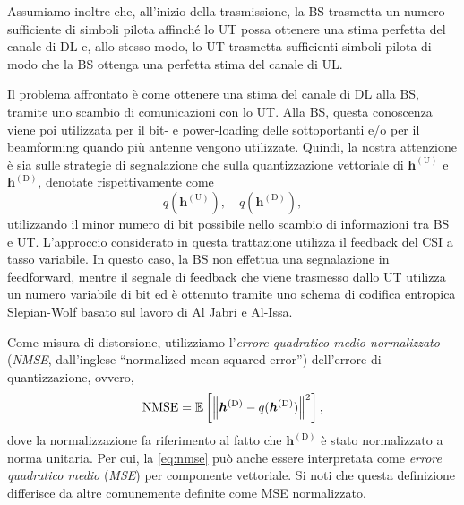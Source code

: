 Assumiamo inoltre che, all'inizio della trasmissione, la BS trasmetta un numero
sufficiente di simboli pilota affinché lo UT possa ottenere una stima perfetta
del canale di DL e, allo stesso modo, lo UT trasmetta sufficienti simboli
pilota di modo che la BS ottenga una perfetta stima del canale di UL.

Il problema affrontato è come ottenere una stima del canale di DL alla BS,
tramite uno scambio di comunicazioni con lo UT. Alla BS, questa conoscenza
viene poi utilizzata per il bit- e power-loading delle sottoportanti e/o per il
beamforming quando più antenne vengono utilizzate. Quindi, la nostra attenzione
è sia sulle strategie di segnalazione che sulla quantizzazione vettoriale di
\(\bm{h}^\mathrm{(U)}\) e \(\bm{h}^\mathrm{(D)}\), denotate rispettivamente
come
\begin{equation}
    q(\bm{h}^\mathrm{(U)}), \quad q(\bm{h}^\mathrm{(D)}),
\end{equation}
utilizzando il minor numero di bit possibile nello scambio di informazioni tra
BS e UT. L'approccio considerato in questa trattazione utilizza il feedback del
CSI a tasso variabile. In questo caso, la BS non effettua una segnalazione in
feedforward, mentre il segnale di feedback che viene trasmesso dallo UT
utilizza un numero variabile di bit ed è ottenuto tramite uno schema di
codifica entropica Slepian-Wolf basato sul lavoro di Al Jabri e
Al-Issa.\cite{10.1007/BFb0024445}

Come misura di distorsione, utilizziamo l'\textit{errore quadratico medio
normalizzato} (\textit{NMSE}, dall'inglese ``normalized mean squared error'')
dell'errore di quantizzazione, ovvero,
\begin{equation} \label{eq:nmse}
    \mathrm{NMSE} = \mathbb{E}\left[
        \left\| \bm{h}^\mathrm{(D)} - q(\bm{h}^\mathrm{(D)}) \right\|^2
        \right],
\end{equation}
dove la normalizzazione fa riferimento al fatto che \(\bm{h}^\mathrm{(D)}\) è
stato normalizzato a norma unitaria. Per cui, la \eqref{eq:nmse} può anche
essere interpretata come \textit{errore quadratico medio} (\textit{MSE}) per
componente vettoriale. Si noti che questa definizione differisce da altre
comunemente definite come MSE normalizzato.
